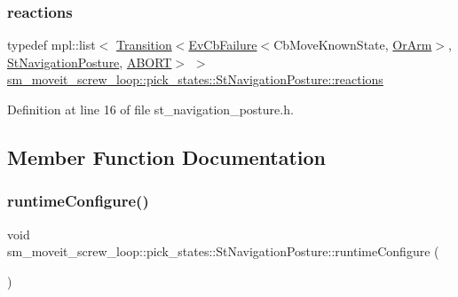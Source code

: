 \subsubsection{\texorpdfstring{reactions}{reactions}}
{\footnotesize\ttfamily typedef mpl\+::list$<$ \hyperlink{classsmacc_1_1Transition}{Transition}$<$\hyperlink{structsmacc_1_1EvCbFailure}{Ev\+Cb\+Failure}$<$Cb\+Move\+Known\+State, \hyperlink{classsm__moveit__screw__loop_1_1OrArm}{Or\+Arm}$>$, \hyperlink{structsm__moveit__screw__loop_1_1pick__states_1_1StNavigationPosture}{St\+Navigation\+Posture}, \hyperlink{structsmacc_1_1default__transition__tags_1_1ABORT}{A\+B\+O\+RT}$>$ $>$ \hyperlink{structsm__moveit__screw__loop_1_1pick__states_1_1StNavigationPosture_a4f22b6ddea2186c8f2a16859c03928e9}{sm\+\_\+moveit\+\_\+screw\+\_\+loop\+::pick\+\_\+states\+::\+St\+Navigation\+Posture\+::reactions}}



Definition at line 16 of file st\+\_\+navigation\+\_\+posture.\+h.



\subsection{Member Function Documentation}
\mbox{\label{structsm__moveit__screw__loop_1_1pick__states_1_1StNavigationPosture_afe3f2a941d6ad586925db22af5c8cc89}} 
\subsubsection{\texorpdfstring{runtime\+Configure()}{runtimeConfigure()}}
{\footnotesize\ttfamily void sm\+\_\+moveit\+\_\+screw\+\_\+loop\+::pick\+\_\+states\+::\+St\+Navigation\+Posture\+::runtime\+Configure (\begin{DoxyParamCaption}{ }\end{DoxyParamCaption})\hspace{0.3cm}{\ttfamily [inline]}}



